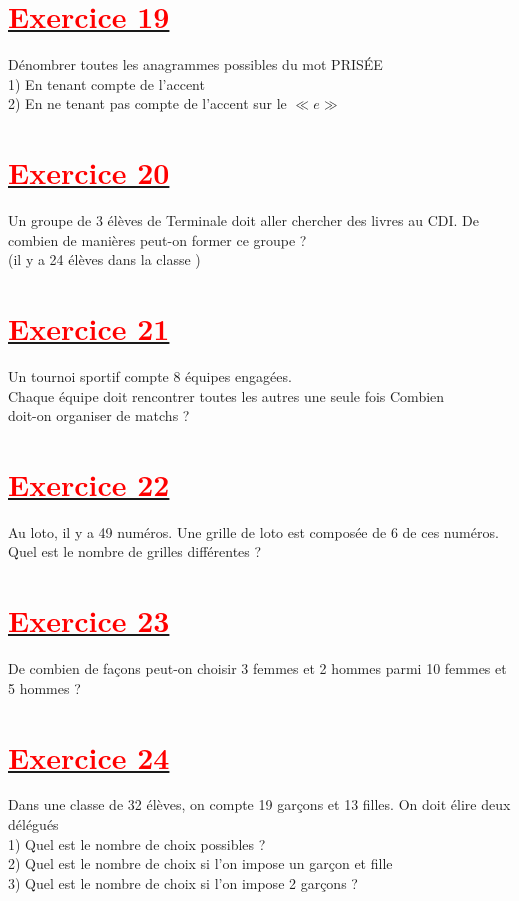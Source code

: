 \documentclass[12pt,a4paper]{article}
\begin{document}
\section*{\underline{\textbf{\textcolor{red}{Exercice 19}}}}
Dénombrer toutes les anagrammes possibles du mot PRISÉE\\
1) En tenant compte de l’accent\\
2) En ne tenant pas compte de l’accent sur le $\ll e \gg$ 
\section*{\underline{\textbf{\textcolor{red}{Exercice 20}}}}
Un groupe de 3 élèves de Terminale doit aller chercher des livres au CDI. De combien de manières peut-on former ce groupe ?\\ (il y a 24 élèves dans la classe )
\section*{\underline{\textbf{\textcolor{red}{Exercice 21}}}}
Un tournoi sportif compte 8 équipes engagées. \\Chaque équipe doit rencontrer toutes les autres une seule fois Combien\\ doit-on organiser de matchs ?
\section*{\underline{\textbf{\textcolor{red}{Exercice 22}}}}
Au loto, il y a 49 numéros. Une grille de loto est composée de 6 de ces numéros. Quel est le nombre de grilles
différentes ?
\section*{\underline{\textbf{\textcolor{red}{Exercice 23}}}}
De combien de façons peut-on choisir 3 femmes et 2 hommes parmi 10 femmes et 5 hommes ?
\section*{\underline{\textbf{\textcolor{red}{Exercice 24}}}}
Dans une classe de 32 élèves, on compte 19 garçons et 13 filles. On doit élire deux délégués\\
1) Quel est le nombre de choix possibles ?\\
2) Quel est le nombre de choix si l’on impose un garçon et fille\\
3) Quel est le nombre de choix si l’on impose 2 garçons ?\\
\end{document}
